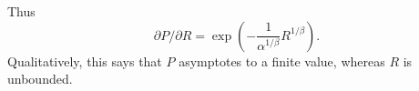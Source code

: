 \documentclass[11pt,letterpaper]{article}
\newif \ifcomment
\newcommand\rljf[1]{\ifcomment{{\color{blue}(#1)}}\else{}\fi}
\begin{document}
Thus
\begin{equation}\label{eq:derivatives}
	\partial P/\partial R = \exp\left(-\frac{1}{\alpha^{1/\beta}} R^{1/\beta}\right). %
\end{equation}
Qualitatively, this says that $P$ asymptotes to a finite value, whereas $R$ is unbounded. \rljf{Exactly the opposite of Dembowski's finding}

%
%
%



%
%


%
%
%
%
%
\end{document}
